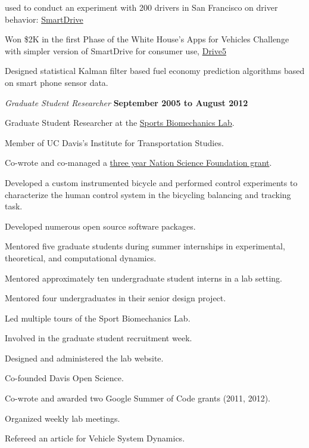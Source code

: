 \documentclass[10pt]{article}
\newenvironment{outerlist}[1][\enskip\textbullet]%
        {\begin{itemize}[#1]}{\end{itemize}%
         \vspace{-.6\baselineskip}}
\newenvironment{innerlist}[1][\enskip\textbullet]%
        {\begin{compactitem}[#1]}{\end{compactitem}}
\begin{document}
\begin{outerlist}
\begin{innerlist}
      used to conduct an experiment with 200 drivers in San Francisco on driver
      behavior: \href{http://smartdrive.ucdavis.edu}{SmartDrive}
    \item Won \$2K in the first Phase of the White House's Apps for Vehicles
      Challenge with simpler version of SmartDrive for consumer use,
      \href{http://drive5.us}{Drive5}
    \item Designed statistical Kalman filter based fuel economy prediction
      algorithms based on smart phone sensor data.
  \end{innerlist}
  \item[] \textit{Graduate Student Researcher}%
        \hfill \textbf{September 2005 to August 2012}
  \begin{innerlist}
    \item Graduate Student Researcher at the
      \href{http://biosport.ucdavis.edu}{Sports Biomechanics Lab}.
    \item Member of UC Davis's Institute for Transportation Studies.
    \item Co-wrote and co-managed a
        \href{http://nsf.gov/awardsearch/showAward.do?AwardNumber=0928339}{three year
        Nation Science Foundation grant}.
    \item Developed a custom instrumented bicycle and performed control
        experiments to characterize the human control system in the bicycling
        balancing and tracking task.
    \item Developed numerous open source software packages.
    \item Mentored five graduate students during summer internships in
      experimental, theoretical, and computational dynamics.
    \item Mentored approximately ten undergraduate student interns in a lab
      setting.
    \item Mentored four undergraduates in their senior design project.
    \item Led multiple tours of the Sport Biomechanics Lab.
    \item Involved in the graduate student recruitment week.
    \item Designed and administered the lab website.
    \item Co-founded Davis Open Science.
    \item Co-wrote and awarded two Google Summer of Code grants (2011, 2012).
    \item Organized weekly lab meetings.
    \item Refereed an article for Vehicle System Dynamics.

\end{innerlist}
\end{outerlist}
\end{document}
